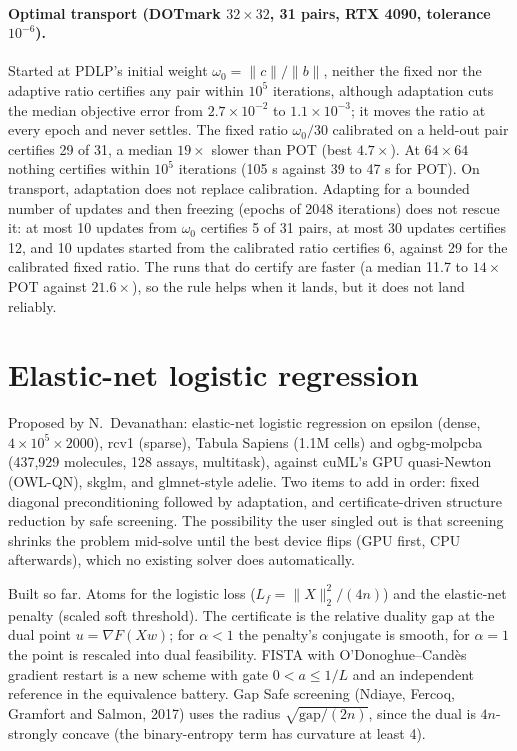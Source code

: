 \documentclass[11pt]{article}
\begin{document}
\paragraph{Optimal transport (DOTmark $32\times32$, 31 pairs, RTX 4090, tolerance $10^{-6}$).}
Started at PDLP's initial weight $\omega_0 = \|c\|/\|b\|$, neither the fixed nor
the adaptive ratio certifies any pair within $10^5$ iterations, although
adaptation cuts the median objective error from $2.7\times10^{-2}$ to
$1.1\times10^{-3}$; it moves the ratio at every epoch and never settles. The
fixed ratio $\omega_0/30$ calibrated on a held-out pair certifies 29 of 31, a
median $19\times$ slower than POT (best $4.7\times$). At $64\times64$ nothing
certifies within $10^5$ iterations (105 s against 39 to 47 s for POT). On
transport, adaptation does not replace calibration.
Adapting for a bounded number of updates and then freezing (epochs of 2048
iterations) does not rescue it: at most 10 updates from $\omega_0$ certifies 5
of 31 pairs, at most 30 updates certifies 12, and 10 updates started from the
calibrated ratio certifies 6, against 29 for the calibrated fixed ratio. The
runs that do certify are faster (a median 11.7 to $14\times$ POT against
$21.6\times$), so the rule helps when it lands, but it does not land reliably.

\section{Elastic-net logistic regression}
\label{app:log:logreg}

Proposed by N.~Devanathan: elastic-net logistic regression on epsilon (dense,
$4\times10^5\times2000$), rcv1 (sparse), Tabula Sapiens (1.1M cells) and
ogbg-molpcba (437,929 molecules, 128 assays, multitask), against cuML's GPU
quasi-Newton (OWL-QN), skglm, and glmnet-style adelie. Two items to add in
order: fixed diagonal preconditioning followed by adaptation, and
certificate-driven structure reduction by safe screening. The possibility
the user singled out is that screening shrinks the problem mid-solve until
the best device flips (GPU first, CPU afterwards), which no existing solver
does automatically.

Built so far. Atoms for the logistic loss ($L_f = \|X\|_2^2/(4n)$) and the
elastic-net penalty (scaled soft threshold). The certificate is the relative
duality gap at the dual point $u = \nabla F(Xw)$; for $\alpha<1$ the penalty's
conjugate is smooth, for $\alpha=1$ the point is rescaled into dual
feasibility. FISTA with O'Donoghue--Cand\`es gradient restart is a new scheme
with gate $0 < a \le 1/L$ and an independent reference in the equivalence
battery. Gap Safe screening (Ndiaye, Fercoq, Gramfort and Salmon, 2017)
uses the radius $\sqrt{\mathrm{gap}/(2n)}$, since the dual is $4n$-strongly
concave (the binary-entropy term has curvature at least 4).
\end{document}
